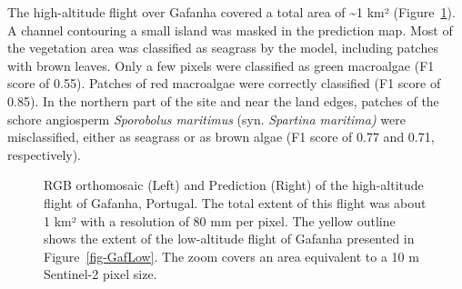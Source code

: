\documentclass[
  letterpaper,
  11pt,
  english,
  singlespacing,
  headsepline]{MastersDoctoralThesis}
\begin{document}
\begin{spacing}{1.5}
\begin{figure}
\end{figure}%

The high-altitude flight over Gafanha covered a total area of
\textasciitilde1 km² (Figure~\ref{fig-GafHigh}). A channel contouring a
small island was masked in the prediction map. Most of the vegetation
area was classified as seagrass by the model, including patches with
brown leaves. Only a few pixels were classified as green macroalgae (F1
score of 0.55). Patches of red macroalgae were correctly classified (F1
score of 0.85). In the northern part of the site and near the land
edges, patches of the schore angiosperm \emph{Sporobolus maritimus}
(syn. \emph{Spartina maritima)} were misclassified, either as seagrass
or as brown algae (F1 score of 0.77 and 0.71, respectively).

\begin{figure}


\caption{\label{fig-GafHigh}RGB orthomosaic (Left) and Prediction
(Right) of the high-altitude flight of Gafanha, Portugal. The total
extent of this flight was about 1 km² with a resolution of 80 mm per
pixel. The yellow outline shows the extent of the low-altitude flight of
Gafanha presented in Figure~\ref{fig-GafLow}. The zoom covers an area
equivalent to a 10 m Sentinel-2 pixel size.}

\end{figure}%


\end{spacing}
\end{document}
